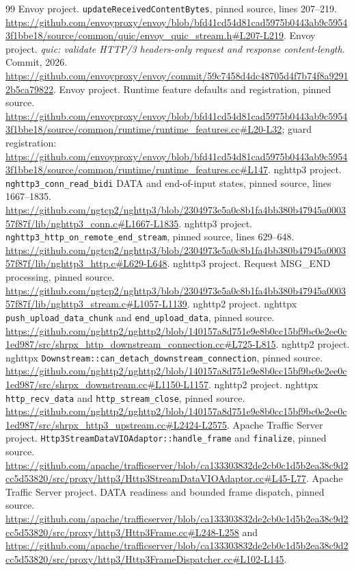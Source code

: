 \documentclass[11pt,letterpaper]{article}
\newcommand{\code}[1]{\nolinkurl{#1}}
\begin{document}
\begin{thebibliography}{99}
 Envoy project. \code{updateReceivedContentBytes}, pinned source, lines 207--219. \url{https://github.com/envoyproxy/envoy/blob/bfd41cd54d81cad5975b0443ab9c59543f1bbe18/source/common/quic/envoy_quic_stream.h#L207-L219}.
 Envoy project. \emph{quic: validate HTTP/3 headers-only request and response content-length}. Commit, 2026. \url{https://github.com/envoyproxy/envoy/commit/59c7458d4dc48705d4f7b74f8a92912b5ca79822}.
 Envoy project. Runtime feature defaults and registration, pinned source. \url{https://github.com/envoyproxy/envoy/blob/bfd41cd54d81cad5975b0443ab9c59543f1bbe18/source/common/runtime/runtime_features.cc#L20-L32}; guard registration: \url{https://github.com/envoyproxy/envoy/blob/bfd41cd54d81cad5975b0443ab9c59543f1bbe18/source/common/runtime/runtime_features.cc#L147}.
 nghttp3 project. \code{nghttp3_conn_read_bidi} DATA and end-of-input states, pinned source, lines 1667--1835. \url{https://github.com/ngtcp2/nghttp3/blob/2304973e5a0c8b1fa4bb380b47945a000357f87f/lib/nghttp3_conn.c#L1667-L1835}.
 nghttp3 project. \code{nghttp3_http_on_remote_end_stream}, pinned source, lines 629--648. \url{https://github.com/ngtcp2/nghttp3/blob/2304973e5a0c8b1fa4bb380b47945a000357f87f/lib/nghttp3_http.c#L629-L648}.
 nghttp3 project. Request MSG\_END processing, pinned source. \url{https://github.com/ngtcp2/nghttp3/blob/2304973e5a0c8b1fa4bb380b47945a000357f87f/lib/nghttp3_stream.c#L1057-L1139}.
 nghttp2 project. nghttpx \code{push_upload_data_chunk} and \code{end_upload_data}, pinned source. \url{https://github.com/nghttp2/nghttp2/blob/140157a8d751e9e8b0cc15bf9bc0e2ee0c1ed987/src/shrpx_http_downstream_connection.cc#L725-L815}.
 nghttp2 project. nghttpx \code{Downstream::can_detach_downstream_connection}, pinned source. \url{https://github.com/nghttp2/nghttp2/blob/140157a8d751e9e8b0cc15bf9bc0e2ee0c1ed987/src/shrpx_downstream.cc#L1150-L1157}.
 nghttp2 project. nghttpx \code{http_recv_data} and \code{http_stream_close}, pinned source. \url{https://github.com/nghttp2/nghttp2/blob/140157a8d751e9e8b0cc15bf9bc0e2ee0c1ed987/src/shrpx_http3_upstream.cc#L2424-L2575}.
 Apache Traffic Server project. \code{Http3StreamDataVIOAdaptor::handle_frame} and \code{finalize}, pinned source. \url{https://github.com/apache/trafficserver/blob/ca133303832de2cb0c1d5b2ea38c9d2cc5d53820/src/proxy/http3/Http3StreamDataVIOAdaptor.cc#L45-L77}.
 Apache Traffic Server project. DATA readiness and bounded frame dispatch, pinned source. \url{https://github.com/apache/trafficserver/blob/ca133303832de2cb0c1d5b2ea38c9d2cc5d53820/src/proxy/http3/Http3Frame.cc#L248-L258} and \url{https://github.com/apache/trafficserver/blob/ca133303832de2cb0c1d5b2ea38c9d2cc5d53820/src/proxy/http3/Http3FrameDispatcher.cc#L102-L145}.

\end{thebibliography}
\end{document}

